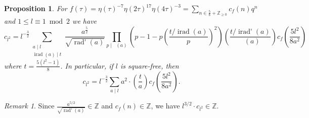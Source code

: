 \documentclass[12pt]{amsart}
\numberwithin{equation}{section}
\theoremstyle{plain}
\newtheorem{prop}[thm]{Proposition}
\theoremstyle{definition}
\theoremstyle{remark}
\newtheorem{rema}[thm]{Remark}
\newcommand\twoscript[2]{\substack{{#1} \\ {#2}}}
\newcommand\legendre[2]{\genfrac{(}{)}{}{}{#1}{#2}}
\newcommand\radE{\mathop{\mathrm{rad}_E}}
\newcommand\radO{\mathop{\mathrm{rad}_O}}
\newcommand\radp{\mathop{\mathrm{rad}'}}
\newcommand\irad{\mathop{\mathrm{irad}}}
\newcommand\iradp{\mathop{\mathrm{irad}'}}
\newcommand\numZ{\mathbb{Z}}
\newcommand\numgeq[2]{\mathbb{#1}_{\geq #2}}
\begin{document}
\begin{prop}
For $f(\tau)=\eta(\tau)^{-7}\eta(2\tau)^{17}\eta(4\tau)^{-3}=\sum_{n\in\frac{5}{8}+\numgeq{Z}{0}}c_f(n)q^n$ and $1\leq l\equiv1\bmod{2}$ we have
\begin{equation*}
c_{l^2}=l^{-\frac{3}{2}}\sum_{\twoscript{a\mid l}{\irad(a)\mid t}}\frac{a^{\frac{5}{2}}}{\sqrt{\radp(a)}}\prod_{p \mid \radE(a)}\left(p-1-p\legendre{t/\irad(a)}{p}^2\right)\legendre{t/\iradp(a)}{\radO(a)}c_f\left(\frac{5l^2}{8a^2}\right)
\end{equation*}
where $t=\frac{5(l^2-1)}{8}$. In particular, if $l$ is square-free, then
\begin{equation*}
c_{l^2}=l^{-\frac{3}{2}}\sum_{a\mid l}a^2\cdot\legendre{t}{a}c_f\left(\frac{5l^2}{8a^2}\right).
\end{equation*}
\end{prop}
\begin{rema}
Since $\frac{a^{5/2}}{\sqrt{\radp(a)}}\in\numZ$ and $c_f(n)\in\numZ$, we have $l^{3/2}\cdot c_{l^2}\in\numZ$.
\end{rema}
\end{document}
